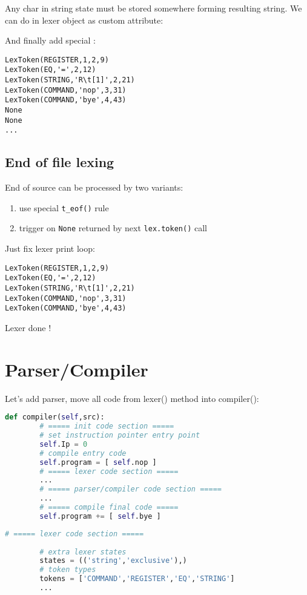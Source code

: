 Any char in string state must be stored somewhere forming resulting string. We
can do in lexer object as custom attribute:


And finally add special :

\begin{lstlisting}
LexToken(REGISTER,1,2,9)
LexToken(EQ,'=',2,12)
LexToken(STRING,'R\t[1]',2,21)
LexToken(COMMAND,'nop',3,31)
LexToken(COMMAND,'bye',4,43)
None
None
...
\end{lstlisting}

\subsection{End of file lexing}

End of source can be processed by two variants:
\begin{enumerate}[nosep]
  \item use special \verb|t_eof()| rule
  \item trigger on \verb|None| returned by next \verb|lex.token()| call 
\end{enumerate}

Just fix lexer print loop:

\begin{lstlisting}
LexToken(REGISTER,1,2,9)
LexToken(EQ,'=',2,12)
LexToken(STRING,'R\t[1]',2,21)
LexToken(COMMAND,'nop',3,31)
LexToken(COMMAND,'bye',4,43)
\end{lstlisting}

\begin{center}{\Huge Lexer done !}\end{center}

\section{Parser/Compiler}

Let's add parser, move all code from lexer() method into compiler():
\begin{lstlisting}[language=python]
	def compiler(self,src):
		# ===== init code section =====
		# set instruction pointer entry point
		self.Ip = 0							
		# compile entry code	
		self.program = [ self.nop ]
		# ===== lexer code section =====
		...
		# ===== parser/compiler code section =====
		...
		# ===== compile final code =====
		self.program += [ self.bye ]
\end{lstlisting}

\begin{lstlisting}[language=python]
		# ===== lexer code section =====
		
		# extra lexer states
		states = (('string','exclusive'),)
		# token types
		tokens = ['COMMAND','REGISTER','EQ','STRING']
		...
\end{lstlisting}

